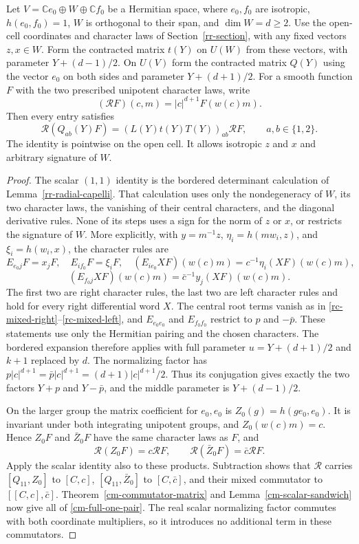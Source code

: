 \begin{theorem}\label{cm-full-restriction}
Let $V=\mathbb C e_0\oplus W\oplus\mathbb C f_0$ be a Hermitian
space, where $e_0,f_0$ are isotropic, $h(e_0,f_0)=1$,
$W$ is orthogonal to their span, and $\dim W=d\geq2$.
Use the open-cell coordinates and character laws of
Section~\ref{rr-section}, with any fixed vectors $z,x\in W$.
Form the contracted matrix $t(Y)$ on $U(W)$ from these vectors,
with parameter $Y+(d-1)/2$.
On $U(V)$ form the contracted matrix $Q(Y)$ using the vector
$e_0$ on both sides and parameter $Y+(d+1)/2$.
For a smooth function $F$ with the two prescribed unipotent
character laws, write
\[
 (\mathcal RF)(c,m)=|c|^{d+1}F(w(c)m).
\]
Then every entry satisfies
\begin{equation}\label{cm-full-one-pair}
 \mathcal R(Q_{ab}(Y)F)
        =(L(Y)t(Y)T(Y))_{ab}\mathcal RF,
               \qquad a,b\in\{1,2\}.
\end{equation}
The identity is pointwise on the open cell.  It allows isotropic
$z$ and $x$ and arbitrary signature of $W$.
\end{theorem}

\begin{proof}
The scalar $(1,1)$ identity is the bordered determinant calculation
of Lemma~\ref{rr-radial-capelli}.  That calculation uses only the
nondegeneracy of $W$, its two character laws, the vanishing of their
central characters, and the diagonal derivative rules.  None of its
steps uses a sign for the norm of $z$ or $x$, or restricts the signature
of $W$.  More explicitly, with
$y=m^{-1}z$, $\eta_i=h(mw_i,z)$, and $\xi_i=h(w_i,x)$,
the character rules are
\[
 E_{e_0j}F=x_jF,\quad E_{if_0}F=\xi_iF,\quad
 (E_{ie_0}XF)(w(c)m)=c^{-1}\eta_i(XF)(w(c)m),
\]
\[
 (E_{f_0j}XF)(w(c)m)=\bar c^{-1}y_j(XF)(w(c)m).
\]
The first two are right character rules, the last two are left
character rules and hold for every right differential word $X$.
The central root terms vanish as in
\eqref{rc-mixed-right}--\eqref{rc-mixed-left}, and
$E_{e_0e_0}$ and $E_{f_0f_0}$ restrict to $p$ and $-\bar p$.
These statements use only the Hermitian pairing and the chosen
characters.  The bordered expansion therefore applies with full
parameter $u=Y+(d+1)/2$ and $k+1$ replaced by $d$.
The normalizing factor has
$p|c|^{d+1}=\bar p|c|^{d+1}=(d+1)|c|^{d+1}/2$.
Thus its conjugation gives exactly the two factors $Y+p$ and
$Y-\bar p$, and the middle parameter is $Y+(d-1)/2$.

On the larger group the matrix coefficient for $e_0,e_0$ is
$Z_0(g)=h(ge_0,e_0)$.  It is invariant under both integrating
unipotent groups, and $Z_0(w(c)m)=c$.  Hence $Z_0F$ and
$\bar Z_0F$ have the same character laws as $F$, and
\[
 \mathcal R(Z_0F)=c\mathcal RF,\qquad
 \mathcal R(\bar Z_0F)=\bar c\mathcal RF.
\]
Apply the scalar identity also to these products.  Subtraction
shows that $\mathcal R$ carries $[Q_{11},Z_0]$ to $[C,c]$,
$[Q_{11},\bar Z_0]$ to $[C,\bar c]$, and their mixed
commutator to $[[C,c],\bar c]$.  Theorem~\ref{cm-commutator-matrix}
and Lemma~\ref{cm-scalar-sandwich} now give all of
\eqref{cm-full-one-pair}.  The real scalar normalizing factor
commutes with both coordinate multipliers, so it introduces no
additional term in these commutators.
\end{proof}

